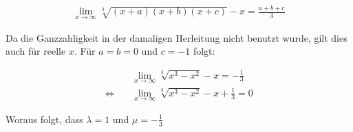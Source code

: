 \documentclass[a4paper,german,12pt,smallheadings]{scrartcl}
\begin{document}
\begin{align*}
  \lim_{x \to \infty} \sqrt[3]{(x+a)(x+b)(x+c)} - x = \frac{a+b+c}{3}
\end{align*}

Da die Ganzzahligkeit in der damaligen Herleitung nicht benutzt wurde, gilt
dies auch für reelle $x$. Für $a = b = 0$ und $c = -1$ folgt:

\begin{align*}
  &\lim_{x \to \infty} \sqrt[3]{x^3 - x^2} - x = -\frac{1}{3} \\
  \Leftrightarrow\quad &\lim_{x \to \infty} \sqrt[3]{x^3 - x^2} - x + \frac{1}{3} = 0
\end{align*}

Woraus folgt, dass $\lambda = 1$ und $\mu = -\frac{1}{3}$
\end{document}
